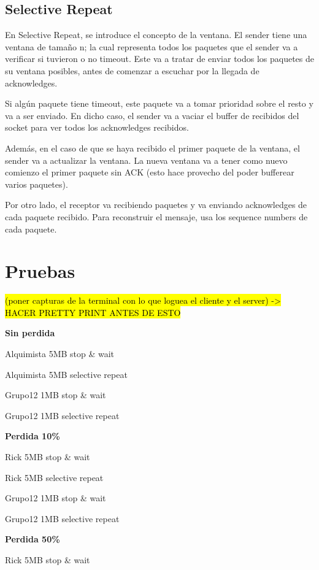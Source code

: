 \documentclass{article}
\begin{document}
\subsection{Selective Repeat}\label{selective-repeat}

En Selective Repeat, se introduce el concepto de la ventana. El sender tiene una ventana de tamaño n; la cual representa todos los paquetes que el sender va a verificar si tuvieron o no timeout. Este va a tratar de enviar todos los paquetes de su ventana posibles, antes de comenzar a escuchar por la llegada de acknowledges.

Si algún paquete tiene timeout, este paquete va a tomar prioridad sobre el resto y va a ser enviado. En dicho caso, el sender va a vaciar el buffer de recibidos del socket para ver todos los acknowledges recibidos.

Además, en el caso de que se haya recibido el primer paquete de la ventana, el sender va a actualizar la ventana. La nueva ventana va a tener como nuevo comienzo el primer paquete sin ACK (esto hace provecho del poder bufferear varios paquetes).

Por otro lado, el receptor va recibiendo paquetes y va enviando acknowledges de cada paquete recibido. Para reconstruir el mensaje, usa los sequence numbers de cada paquete.

\section{\texorpdfstring{\textbf{Pruebas}}{Pruebas}}\label{pruebas-wip}

\hl{(poner capturas de la terminal con lo que loguea el cliente y el
server) -\textgreater{} HACER PRETTY PRINT ANTES DE ESTO}

\textbf{Sin perdida}

Alquimista 5MB stop \& wait

Alquimista 5MB selective repeat

Grupo12 1MB stop \& wait

Grupo12 1MB selective repeat

\textbf{Perdida 10\%}

Rick 5MB stop \& wait

Rick 5MB selective repeat

Grupo12 1MB stop \& wait

Grupo12 1MB selective repeat

\textbf{Perdida 50\%}

Rick 5MB stop \& wait
\end{document}
